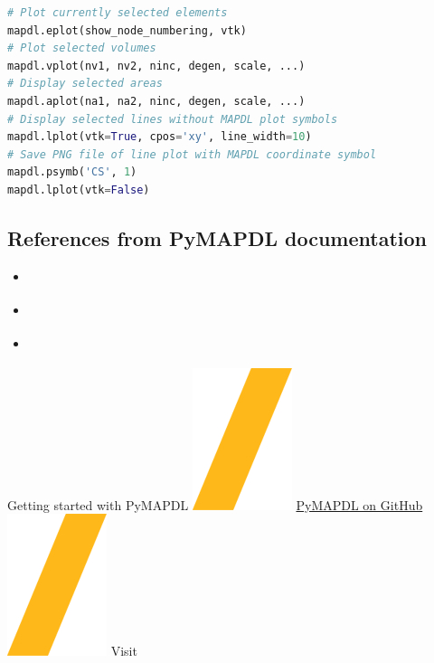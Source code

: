 \documentclass[9pt,landscape]{article}
\begin{document}
\begin{multicols}{3}
\begin{lstlisting}[language=Python]
# Plot currently selected elements
mapdl.eplot(show_node_numbering, vtk)
# Plot selected volumes
mapdl.vplot(nv1, nv2, ninc, degen, scale, ...)
# Display selected areas
mapdl.aplot(na1, na2, ninc, degen, scale, ...)
# Display selected lines without MAPDL plot symbols
mapdl.lplot(vtk=True, cpos='xy', line_width=10)
# Save PNG file of line plot with MAPDL coordinate symbol
mapdl.psymb('CS', 1)
mapdl.lplot(vtk=False)
\end{lstlisting} 
\vfill

\subsection{References from PyMAPDL documentation}
\begin{itemize}
\item \href{https://mapdl.docs.pyansys.com/version/stable/getting_started/index.html}{\color{blue}{Getting started}}
\item \href{https://mapdl.docs.pyansys.com/version/stable/mapdl_commands/index.html}{\color{blue}{MAPDL commands}}
\item \href{https://mapdl.docs.pyansys.com/version/stable/api/index.html}{\color{blue}{API reference}}
\end{itemize}
\end{multicols}
\vspace{-0.15cm}
\noindent\makebox[\linewidth]{\rule{\paperwidth}{4pt}}
\begin{center}
Getting started with PyMAPDL \includegraphics[height=\fontcharht\font`\S]{slash.png} \href{https://github.com/ansys/pymapdl}{{\color{blue}PyMAPDL on GitHub}} \includegraphics[height=\fontcharht\font`\S]{slash.png} Visit 
\end{center}
\end{document}
